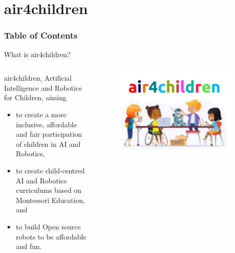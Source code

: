 \section{air4children}


\begin{frame}
      \frametitle{Table of Contents}
      \tableofcontents[currentsection]
\end{frame}


{
\begin{frame}{What is air4children?}

  \begin{columns}
  \begin{column}{.7\linewidth}

  air4children, Artificial Intelligence and Robotics for Children, aiming  
  \begin{itemize}
    \item to create a more inclusive, affordable and fair participation of children in AI and Robotics,
    \item to create child-centred AI and Robotics curriculums based on Montessori Education, and
    \item to build Open source robots to be affordable and fun. 
  \end{itemize}

    \end{column}


  \begin{column}{.4\linewidth}

      \begin{figure}
        \centering
        \includegraphics[width=0.95\textwidth]{./figures/logo/outputs/drawing-v00.png}
      \end{figure}

    \end{column}
  \end{columns}

\end{frame}
}




